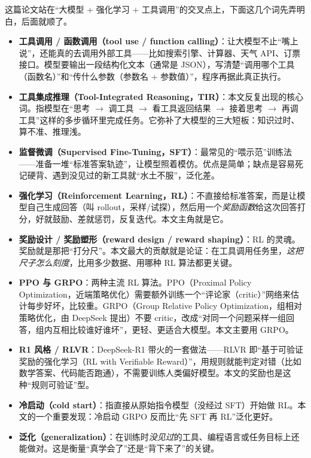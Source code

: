 \documentclass[11pt,UTF8,fontset=fandol]{ctexart}
\begin{document}
这篇论文站在“大模型 + 强化学习 + 工具调用”的交叉点上，下面这几个词先弄明白，后面就顺了。

\begin{itemize}[leftmargin=1.5em]
\item \textbf{工具调用 / 函数调用（tool use / function calling）}：让大模型不止“嘴上说”，还能真的去调用外部工具——比如搜索引擎、计算器、天气 API、订票接口。模型要输出一段结构化文本（通常是 JSON），写清楚“调用哪个工具（函数名）”和“传什么参数（参数名 + 参数值）”，程序再据此真正执行。

\item \textbf{工具集成推理（Tool-Integrated Reasoning，TIR）}：本文反复出现的核心词。指模型在“思考 $\to$ 调工具 $\to$ 看工具返回结果 $\to$ 接着思考 $\to$ 再调工具”这样的多步循环里完成任务。它弥补了大模型的三大短板：知识过时、算不准、推理浅。

\item \textbf{监督微调（Supervised Fine-Tuning，SFT）}：最常见的“喂示范”训练法——准备一堆“标准答案轨迹”，让模型照着模仿。优点是简单；缺点是容易死记硬背、遇到没见过的新工具就“水土不服”，泛化差。

\item \textbf{强化学习（Reinforcement Learning，RL）}：不直接给标准答案，而是让模型自己生成回答（叫 rollout，采样/试探），然后用一个\emph{奖励函数}给这次回答打分，好就鼓励、差就惩罚，反复迭代。本文主角就是它。

\item \textbf{奖励设计 / 奖励塑形（reward design / reward shaping）}：RL 的灵魂。奖励就是那把“打分尺”。本文最大的贡献就是论证：在工具调用任务里，\emph{这把尺子怎么刻度}，比用多少数据、用哪种 RL 算法都更关键。

\item \textbf{PPO 与 GRPO}：两种主流 RL 算法。PPO（Proximal Policy Optimization，近端策略优化）需要额外训练一个“评论家（critic）”网络来估计每步好坏，比较重。GRPO（Group Relative Policy Optimization，组相对策略优化，由 DeepSeek 提出）不要 critic，改成“对同一个问题采样一组回答，组内互相比较谁好谁坏”，更轻、更适合大模型。本文主要用 GRPO。

\item \textbf{R1 风格 / RLVR}：DeepSeek-R1 带火的一套做法——RLVR 即“基于可验证奖励的强化学习（RL with Verifiable Reward）”，用规则就能判定对错（比如数学答案、代码能否跑通），不需要训练人类偏好模型。本文的奖励也是这种“规则可验证”型。

\item \textbf{冷启动（cold start）}：指直接从原始指令模型（没经过 SFT）开始做 RL。本文的一个重要发现：冷启动 GRPO 反而比“先 SFT 再 RL”泛化更好。

\item \textbf{泛化（generalization）}：在训练时\emph{没见过}的工具、编程语言或任务目标上还能做对。这是衡量“真学会了”还是“背下来了”的关键。
\end{itemize}
\end{document}
